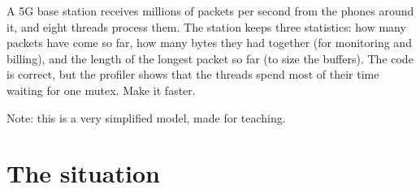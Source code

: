
\begin{story}
A 5G base station receives millions of packets per second from the phones around it, and eight threads
process them. The station keeps three statistics: how many packets have come so far, how many bytes they
had together (for monitoring and billing), and the length of the longest packet so far (to size the buffers).
The code is correct, but the profiler shows that the threads spend most of their time waiting for one mutex.
Make it faster.
\end{story}

Note: this is a very simplified model, made for teaching.

\section{The situation}

